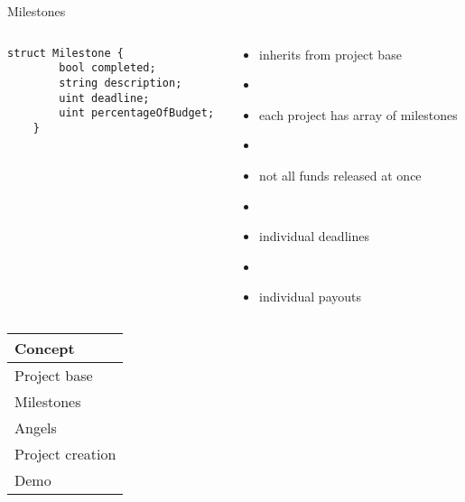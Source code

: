 \documentclass{beamer}
\begin{document}
\begin{frame}[fragile]{Milestones}
\begin{columns}
\begin{column}{0.4\textwidth}
\centering
\begin{lstlisting}[basicstyle=\tiny]
    struct Milestone {
        bool completed;
        string description;
        uint deadline;
        uint percentageOfBudget;
    }
\end{lstlisting}
\end{column}
\begin{column}{0.6\textwidth}
\centering
	\begin{itemize}
		\item inherits from project base
		\item[]
		\item each project has array of milestones
		\item[]
		\item not all funds released at once
		\item[]
		\item individual deadlines
		\item[]
		\item individual payouts
	\end{itemize}
\end{column}
\end{columns}
\end{frame}





\begin{frame}
	\begin{tabularx}{\textwidth}{X}
		\hline
		Concept\\
		\hline
		Project base\\
		\hline
		Milestones\\
		\hline
		\rowcolor{hcolor}
		Angels\\
		\hline
		Project creation\\
		\hline
		Demo\\
		\hline
	\end{tabularx}
\end{frame}
\end{document}
